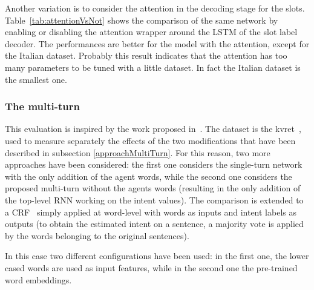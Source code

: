 


Another variation is to consider the attention in the decoding stage for the slots. Table~\ref{tab:attentionVsNot} shows the comparison of the same network by enabling or disabling the attention wrapper around the LSTM of the slot label decoder. The performances are better for the model with the attention, except for the Italian dataset. Probably this result indicates that the attention has too many parameters to be tuned with a little dataset. In fact the Italian dataset is the smallest one.




\subsubsection{The multi-turn}
This evaluation is inspired by the work proposed in~\cite{mensio2018multi}. The dataset is the kvret~\cite{eric2017key}, used to measure separately the effects of the two modifications that have been described in subsection \ref{approachMultiTurn}. For this reason, two more approaches have been considered: the first one considers the single-turn network with the only addition of the agent words, while the second one considers the proposed multi-turn without the agents words (resulting in the only addition of the top-level RNN working on the intent values). The comparison is extended to a CRF~\cite{lafferty2001conditional} simply applied at word-level with words as inputs and intent labels as outputs (to obtain the estimated intent on a sentence, a majority vote is applied by the words belonging to the original sentences). 

In this case two different configurations have been used: in the first one, the lower cased words are used as input features, while in the second one the pre-trained word embeddings.




